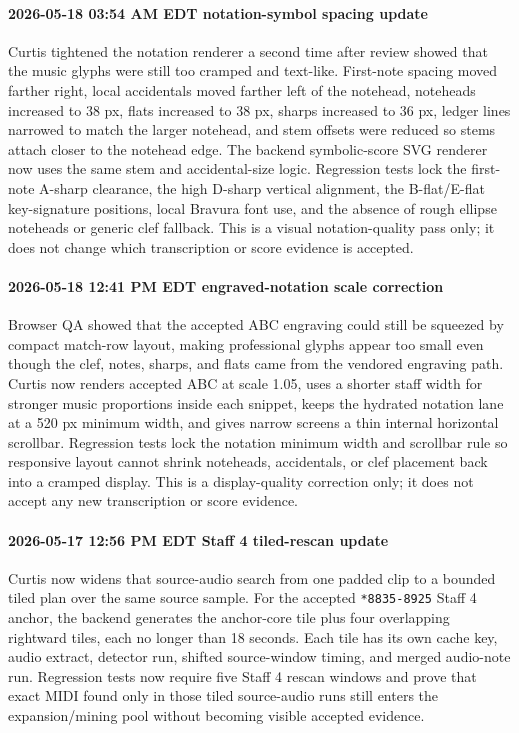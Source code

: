 \paragraph{2026-05-18 03:54 AM EDT notation-symbol spacing update} Curtis tightened the notation renderer a second time after review showed that the music glyphs were still too cramped and text-like. First-note spacing moved farther right, local accidentals moved farther left of the notehead, noteheads increased to 38 px, flats increased to 38 px, sharps increased to 36 px, ledger lines narrowed to match the larger notehead, and stem offsets were reduced so stems attach closer to the notehead edge. The backend symbolic-score SVG renderer now uses the same stem and accidental-size logic. Regression tests lock the first-note A-sharp clearance, the high D-sharp vertical alignment, the B-flat/E-flat key-signature positions, local Bravura font use, and the absence of rough ellipse noteheads or generic clef fallback. This is a visual notation-quality pass only; it does not change which transcription or score evidence is accepted.

\paragraph{2026-05-18 12:41 PM EDT engraved-notation scale correction} Browser QA showed that the accepted ABC engraving could still be squeezed by compact match-row layout, making professional glyphs appear too small even though the clef, notes, sharps, and flats came from the vendored engraving path. Curtis now renders accepted ABC at scale 1.05, uses a shorter staff width for stronger music proportions inside each snippet, keeps the hydrated notation lane at a 520 px minimum width, and gives narrow screens a thin internal horizontal scrollbar. Regression tests lock the notation minimum width and scrollbar rule so responsive layout cannot shrink noteheads, accidentals, or clef placement back into a cramped display. This is a display-quality correction only; it does not accept any new transcription or score evidence.

\paragraph{2026-05-17 12:56 PM EDT Staff 4 tiled-rescan update} Curtis now widens that source-audio search from one padded clip to a bounded tiled plan over the same source sample. For the accepted \texttt{*8835-8925} Staff 4 anchor, the backend generates the anchor-core tile plus four overlapping rightward tiles, each no longer than 18 seconds. Each tile has its own cache key, audio extract, detector run, shifted source-window timing, and merged audio-note run. Regression tests now require five Staff 4 rescan windows and prove that exact MIDI found only in those tiled source-audio runs still enters the expansion/mining pool without becoming visible accepted evidence.

